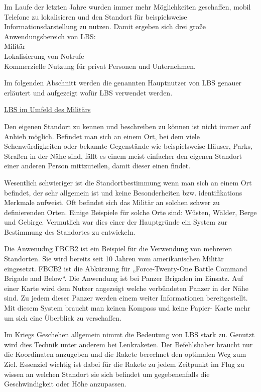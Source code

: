 Im Laufe der letzten Jahre wurden immer mehr Möglichkeiten geschaffen, mobil Telefone zu lokalisieren und den Standort für beispielsweise Informationsdarstellung zu nutzen. Damit ergeben sich drei große Anwendungsbereich von LBS:
\\Militär
\\Lokalisierung von Notrufe
\\Kommerzielle Nutzung für privat Personen und Unternehmen.

Im folgenden Abschnitt werden die genannten Hauptnutzer von LBS genauer erläutert und aufgezeigt wofür LBS verwendet werden.


\underline{LBS im Umfeld des Militärs}

Den eigenen Standort zu kennen und beschreiben zu können ist nicht immer auf Anhieb möglich. Befindet man sich an einem Ort, bei dem viele Sehenwürdigkeiten oder bekannte Gegenstände wie beispielsweise Häuser, Parks, Straßen in der Nähe sind, fällt es einem meist einfacher den eigenen Standort einer anderen Person mittzuteilen, damit dieser einen findet.

Wesentlich schwieriger ist die Standortbestimmung wenn man sich an einem Ort befindet, der sehr allgemein ist und keine Besonderheiten bzw. identifikations Merkmale aufweist. Oft befindet sich das Militär an solchen schwer zu definierenden Orten. Einige Beispiele für solche Orte sind: Wüsten, Wälder, Berge und Gebirge. Vermutlich war dies einer der Hauptgründe ein System zur Bestimmung des Standortes zu entwickeln. 

Die Anwenudng FBCB2 ist ein Beispiel für die Verwendung von mehreren Standorten. Sie wird bereits seit 10 Jahren vom amerikanischen Militär eingesetzt. FBCB2 ist die Abkürzung für „Force-Twenty-One Battle Command Brigade and Below“. Die Anwendung ist bei Panzer Brigaden im Einsatz. Auf einer Karte wird dem Nutzer angezeigt welche verbündeten Panzer in der Nähe sind. Zu jedem dieser Panzer werden einem weiter Informationen bereitgestellt. Mit diesem System braucht man keinen Kompass und keine Papier- Karte mehr um sich eine Überblick zu verschaffen. \cite{FBCB} 

Im Kriegs Geschehen allgemein nimmt die Bedeutung von LBS stark zu. Genutzt wird dies Technik unter anderem bei Lenkraketen. Der Befehlshaber braucht nur die Koordinaten anzugeben und die Rakete berechnet den optimalen Weg zum Ziel. Essenziel wichtig ist dabei für die Rakete zu jedem Zeitpunkt im Flug zu wissen an welchen Standort sie sich befindet um gegebenenfalls die Geschwindigkeit oder Höhe anzupassen. 

